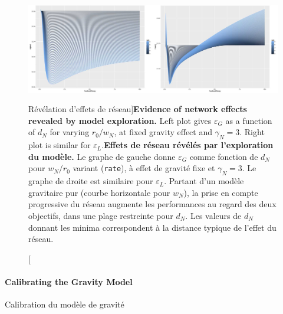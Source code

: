 \begin{figure}
\includegraphics[width=\linewidth]{Figures/Final/4-3-2-fig-interactiongibrat-networkeffects}
\caption[Evidence of network effects][Révélation d'effets de réseau]{\textbf{Evidence of network effects revealed by model exploration.} Left plot gives $\varepsilon_G$ as a function of $d_N$ for varying $r_0/w_N$, at fixed gravity effect and $\gamma_N=3$. Right plot is similar for $\varepsilon_L$.\label{fig:interactiongibrat:networkeffects}}{\textbf{Effets de réseau révélés par l'exploration du modèle.} Le graphe de gauche donne $\varepsilon_G$ comme fonction de $d_N$ pour $w_N/r_0$ variant (\texttt{rate}), à effet de gravité fixe et $\gamma_N=3$. Le graphe de droite est similaire pour $\varepsilon_L$. Partant d'un modèle gravitaire pur (courbe horizontale pour $w_N$), la prise en compte progressive du réseau augmente les performances au regard des deux objectifs, dans une plage restreinte pour $d_N$. Les valeurs de $d_N$ donnant les minima correspondent à la distance typique de l'effet du réseau.\label{fig:interactiongibrat:networkeffects}}
\end{figure}






\paragraph{Calibrating the Gravity Model}{Calibration du modèle de gravité}


